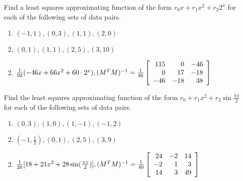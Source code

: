 \begin{multicols}{2}
\begin{ex}
\begin{sol}
\begin{enumerate}[label={\alph*.}]
\end{enumerate}
\end{sol}
\end{ex}

\begin{ex}
Find a least squares approximating function of the form $r_{0}x + r_{1}x^{2} + r_{2}2^{x}$ for each of the following sets of data pairs.

\begin{enumerate}[label={\alph*.}]
\item $(-1, 1), (0, 3), (1, 1), (2, 0)$

\item $(0, 1), (1, 1), (2, 5), (3, 10)$

\end{enumerate}
\begin{sol}
\begin{enumerate}[label={\alph*.}]
\setcounter{enumi}{1}
\item $\tfrac{1}{92}(-46x + 66x^2 + 60 \cdot 2^x), (M^TM)^{-1} = \tfrac{1}{46}
\left[ \begin{array}{rrr}
115 &   0 & -46 \\
  0 &  17 & -18 \\
-46 & -18 &  38
\end{array} \right]$
\end{enumerate}
\end{sol}
\end{ex}

\begin{ex}
	\label{ex:5_6_5}
Find the least squares approximating function of the form $r_0 + r_1x^2 + r_2\sin \frac{\pi x}{2}$ for each of the following sets of data pairs.

\begin{enumerate}[label={\alph*.}]
\item $(0, 3), (1, 0), (1, -1), (-1, 2)$

\item $(-1, \frac{1}{2}), (0, 1), (2, 5), (3, 9)$

\end{enumerate}
\begin{sol}
\begin{enumerate}[label={\alph*.}]
\setcounter{enumi}{1}
\item $\tfrac{1}{20}[18 + 21x^2 + 28\sin (\tfrac{\pi x}{2})], (M^TM)^{-1} = \tfrac{1}{40}
\left[ \begin{array}{rrr}
24 & -2 & 14 \\
-2 &  1 &  3 \\
14 &  3 & 49
\end{array} \right]$
\end{enumerate}
\end{sol}
\end{ex}


\end{multicols}
